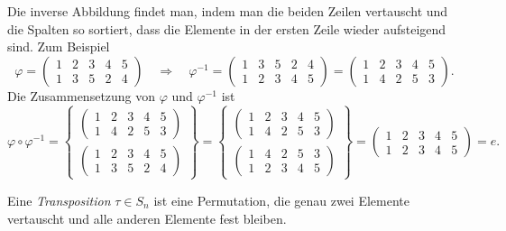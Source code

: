 Die inverse Abbildung findet man, indem man die beiden Zeilen vertauscht
und die Spalten so sortiert, dass die Elemente in der ersten Zeile
wieder aufsteigend sind.
Zum Beispiel
\[
\varphi
=
\begin{pmatrix}
1&2&3&4&5\\
1&3&5&2&4
\end{pmatrix}
\quad\Rightarrow\quad
\varphi^{-1}
=
\begin{pmatrix}
1&3&5&2&4\\
1&2&3&4&5
\end{pmatrix}
=
\begin{pmatrix}
1&2&3&4&5\\
1&4&2&5&3
\end{pmatrix}.
\]
Die Zusammensetzung von $\varphi$ und $\varphi^{-1}$ ist
\[
\varphi\circ\varphi^{-1}
=
\left\{
\begin{array}{c}
\displaystyle
\begin{pmatrix}
1&2&3&4&5\\
1&4&2&5&3
\end{pmatrix}
\\
\displaystyle
\begin{pmatrix}
1&2&3&4&5\\
1&3&5&2&4
\end{pmatrix}
\end{array}
\right\}
=
\left\{
\begin{array}{c}
\displaystyle
\begin{pmatrix}
1&2&3&4&5\\
1&4&2&5&3
\end{pmatrix}
\\
\displaystyle
\begin{pmatrix}
1&4&2&5&3\\
1&2&3&4&5
\end{pmatrix}
\end{array}
\right\}
=
\begin{pmatrix}
1&2&3&4&5\\
1&2&3&4&5
\end{pmatrix}
=
e.
\]

\begin{definition}
Eine {\em Transposition} $\tau\in S_n$ ist eine Permutation, die genau
zwei Elemente vertauscht und alle anderen Elemente fest bleiben.
\end{definition}


